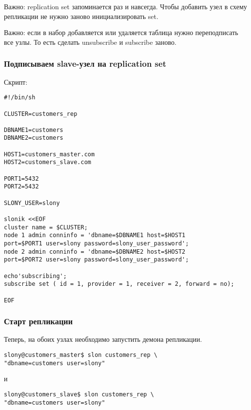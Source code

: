 Важно: replication set запоминается раз и навсегда. Чтобы добавить узел в схему репликации не нужно заново инициализировать set.

Важно: если в набор добавляется или удаляется таблица нужно переподписать все узлы. То есть сделать unsubscribe и subscribe заново.

\subsubsection{Подписываем slave-узел на replication set}

Скрипт:

\begin{lstlisting}[label=lst:slony10,caption=Подписываем slave-узел на replication set]
#!/bin/sh

CLUSTER=customers_rep

DBNAME1=customers
DBNAME2=customers

HOST1=customers_master.com
HOST2=customers_slave.com

PORT1=5432
PORT2=5432

SLONY_USER=slony

slonik <<EOF
cluster name = $CLUSTER;
node 1 admin conninfo = 'dbname=$DBNAME1 host=$HOST1
port=$PORT1 user=slony password=slony_user_password';
node 2 admin conninfo = 'dbname=$DBNAME2 host=$HOST2
port=$PORT2 user=slony password=slony_user_password';

echo'subscribing';
subscribe set ( id = 1, provider = 1, receiver = 2, forward = no);

EOF
\end{lstlisting}

\subsubsection{Старт репликации}

Теперь, на обоих узлах необходимо запустить демона репликации.

\begin{lstlisting}[label=lst:slony11,caption=Старт репликации]
slony@customers_master$ slon customers_rep \
"dbname=customers user=slony"
\end{lstlisting}

и

\begin{lstlisting}[label=lst:slony12,caption=Старт репликации]
slony@customers_slave$ slon customers_rep \
"dbname=customers user=slony"
\end{lstlisting}

